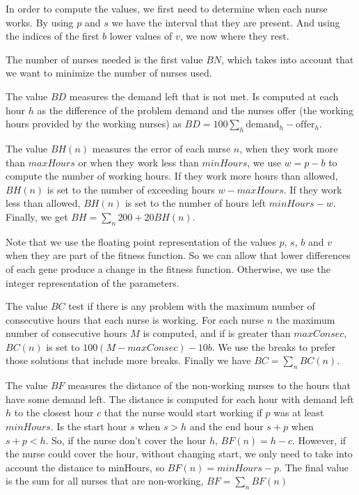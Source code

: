 \documentclass[12pt,a4paper]{article}
\begin{document}
In order to compute the values, we first need to determine when each nurse
works. By using $p$ and $s$ we have the interval that they are present.  And
using the indices of the first $b$ lower values of $v$, we now where they rest.

The number of nurses needed is the first value $BN$, which takes into account
that we want to minimize the number of nurses used.

The value $BD$ measures the demand left that is not met. Is computed at each
hour $h$ as the difference of the problem demand and the nurses offer (the
working hours provided by the working nurses) as $BD = 100 \sum_h
\textrm{demand}_h - \textrm{offer}_h$.

The value $BH(n)$ measures the error of each nurse $n$, when they work more than
$maxHours$ or when they work less than $minHours$, we use $w = p - b$ to compute
the number of working hours. If they work more hours than allowed, $BH(n)$ is
set to the number of exceeding hours $w - maxHours$. If they work less than
allowed, $BH(n)$ is set to the number of hours left $minHours - w$.  Finally, we
get $BH = \sum_n 200 + 20 BH(n)$.

Note that we use the floating point representation of the values $p$, $s$, $b$
and $v$ when they are part of the fitness function. So we can allow that lower
differences of each gene produce a change in the fitness function. Otherwise, we
use the integer representation of the parameters.

The value $BC$ test if there is any problem with the maximum number of
consecutive hours that each nurse is working. For each nurse $n$ the maximum
number of consecutive hours $M$ is computed, and if is greater than $maxConsec$,
$BC(n)$ is set to $100(M - maxConsec) - 10b$. We use the breaks to prefer those
solutions that include more breaks. Finally we have $BC = \sum_n BC(n)$.

The value $BF$ measures the distance of the non-working nurses to the hours that
have some demand left. The distance is computed for each hour with demand left
$h$ to the closest hour $c$ that the nurse would start working if $p$ was at
least $minHours$. Is the start hour $s$ when $s > h$ and the end hour $s+p$ when
$s+p < h$. So, if the nurse don't cover the hour $h$, $BF(n) = h - c$. However,
if the nurse could cover the hour, without changing start, we only need to take
into account the distance to minHours, so $BF(n) = minHours - p$. The final
value is the sum for all nurses that are non-working, $BF = \sum_n BF(n)$
\end{document}
